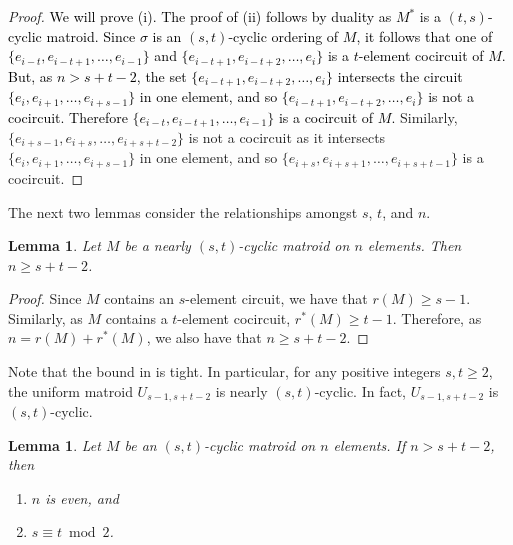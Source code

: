\documentclass[11pt]{amsart}
\newtheorem{lemma}[theorem]{Lemma}
\newcommand{\bloo}{\textcolor{black}}
\begin{document}
\begin{proof}
\bloo{We will prove (i). The proof of (ii) follows by duality as $M^*$ is a $(t,s)$-cyclic matroid. Since $\sigma$ is an $(s,t)$-cyclic ordering of $M$, it follows that one of $\{e_{i-t},e_{i-t+1},\ldots,e_{i-1}\}$ and $\{e_{i-t+1},e_{i-t+2},\ldots,e_i\}$ is a $t$-element cocircuit of $M$. But, as $n > s+t-2$, the set $\{e_{i-t+1},e_{i-t+2},\ldots,e_i\}$ intersects the circuit $\{e_i,e_{i+1},\ldots,e_{i+s-1}\}$ in one element, and so $\{e_{i-t+1},e_{i-t+2},\ldots,e_i\}$ is not a cocircuit. Therefore $\{e_{i-t},e_{i-t+1},\ldots,e_{i-1}\}$ is a cocircuit of $M$.} Similarly, $\{e_{i+s-1},e_{i+s},\ldots,e_{i+s+t-2}\}$ is not a cocircuit as it intersects $\{e_i,e_{i+1},\ldots,e_{i+s-1}\}$ in one element, and so $\{e_{i+s},e_{i+s+1},\ldots,e_{i+s+t-1}\}$ is a cocircuit.
\end{proof}

The next two lemmas consider the relationships amongst $s$, $t$, and $n$.

\begin{lemma}
\label{lower_bound}
Let $M$ be a nearly $(s, t)$-cyclic matroid on $n$ elements. Then $n\geq s + t - 2$.
\end{lemma}

\begin{proof}
Since $M$ contains an $s$-element circuit, we have that $r(M) \geq s-1$. Similarly, as $M$ contains a $t$-element cocircuit, $r^*(M) \geq t-1$. Therefore, as $n = r(M) + r^*(M)$, we also have that $n \geq s+t-2$.
\end{proof}

Note that the bound in  is tight. In particular, for any positive integers $s, t\ge 2$, the uniform matroid $U_{s-1, s+t-2}$ is nearly $(s, t)$-cyclic. In fact, $U_{s-1, s+t-2}$ is $(s, t)$-cyclic.

\begin{lemma}
\label{even_n}
Let $M$ be an $(s, t)$-cyclic matroid on $n$ elements. If $n\left.>s+t-2\right.$, then
\begin{enumerate}[{\rm (i)}]
\item $n$ is even, and

\item $s\equiv t \bmod{2}$.
\end{enumerate}
\end{lemma}
\end{document}
